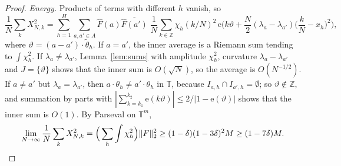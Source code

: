 \documentclass[11pt,reqno]{amsart}
\theoremstyle{definition}
\newcommand{\T}{\mathbb{T}}
\newcommand{\Z}{\mathbb{Z}}
\newcommand{\e}{\mathrm{e}}
\begin{document}
\begin{proof}
\emph{Energy.} Products of terms with different $h$ vanish, so
\[
\frac1N\sum_kX_{N,k}^2=\sum_{h=1}^H\sum_{a,a'\in A}\widehat F(a)\overline{\widehat F(a')}\;\frac1N\sum_{k\in\Z}\chi_h(k/N)^2\,\e\Big(k\vartheta+\frac N2(\lambda_a-\lambda_{a'})\Big(\frac kN-x_h\Big)^2\Big),
\]
where $\vartheta=(a-a')\cdot\tilde\theta_h$. If $a=a'$, the inner average is a Riemann sum tending to $\int\chi_h^2$. If $\lambda_a\ne\lambda_{a'}$, Lemma~\ref{lem:sums} with amplitude $\chi_h^2$, curvature $\lambda_a-\lambda_{a'}$ and $J=\{\vartheta\}$ shows that the inner sum is $O(\sqrt N)$, so the average is $O(N^{-1/2})$. If $a\ne a'$ but $\lambda_a=\lambda_{a'}$, then $a\cdot\theta_h\ne a'\cdot\theta_h$ in $\T$, because $I_{a,h}\cap I_{a',h}=\emptyset$; so $\vartheta\notin\Z$, and summation by parts with $|\sum_{k=k_1}^{k_2}\e(k\vartheta)|\le2/|1-\e(\vartheta)|$ shows that the inner sum is $O(1)$. By Parseval on $\T^m$,
\[
\lim_{N\to\infty}\frac1N\sum_kX_{N,k}^2=\Big(\sum_h\int\chi_h^2\Big)\|F\|_2^2\ge(1-\delta)(1-3\delta)^2M\ge(1-7\delta)M .\qedhere
\]
\end{proof}
\end{document}
